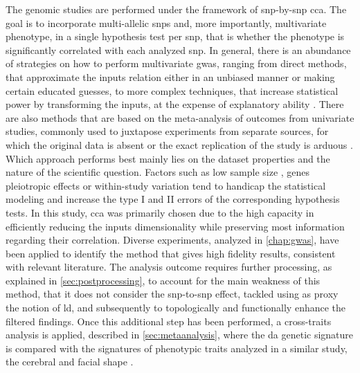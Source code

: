 The genomic studies are performed under the framework of \ac{snp}-by-\ac{snp} \ac{cca}. The goal is to incorporate multi-allelic \acp{snp} and, more importantly, multivariate phenotype, in a single hypothesis test per \ac{snp}, that is whether the phenotype is significantly correlated with each analyzed \ac{snp}. In general, there is an abundance of strategies on how to perform multivariate \ac{gwas}, ranging from direct methods, that approximate the inputs relation either in an unbiased manner or making certain educated guesses, to more complex techniques, that increase statistical power by transforming the inputs, at the expense of explanatory ability \cite{Galesloot2014}. There are also methods that are based on the meta-analysis of outcomes from univariate studies, commonly used to juxtapose experiments from separate sources, for which the original data is absent or the exact replication of the study is arduous \cite{Cichonska2016}. Which approach performs best mainly lies on the dataset properties and the nature of the scientific question. Factors such as low sample size \cite{Sheng2021}, genes pleiotropic effects \cite{Fernandes2021} or within-study variation \cite{Jackson2011} tend to handicap the statistical modeling and increase the type I and II errors of the corresponding hypothesis tests. In this study, \ac{cca} was primarily chosen due to the high capacity in efficiently reducing the inputs dimensionality while preserving most information regarding their correlation. Diverse experiments, analyzed in \autoref{chap:gwas}, have been applied to identify the method that gives high fidelity results, consistent with relevant literature. The analysis outcome requires further processing, as explained in \autoref{sec:postprocessing}, to account for the main weakness of this method, that it does not consider the \ac{snp}-to-\ac{snp} effect, tackled using as proxy the notion of \ac{ld}, and subsequently to topologically and functionally enhance the filtered findings. Once this additional step has been performed, a cross-traits analysis is applied, described in \autoref{sec:metaanalysis}, where the \ac{da} genetic signature is compared with the signatures of phenotypic traits analyzed in a similar study, the cerebral and facial shape \cite{Naqvi2021}. 

 

